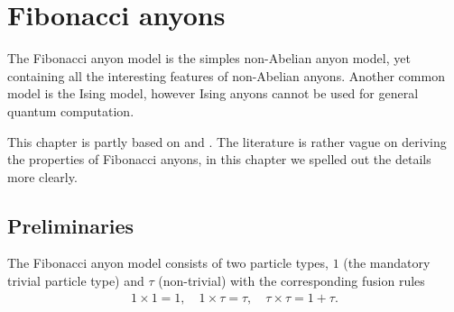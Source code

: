 \documentclass[a4paper,10pt,oneside]{book}
\theoremstyle{plain}
\theoremstyle{definition}
\theoremstyle{remark}
\begin{document}
{\chapter{Fibonacci anyons}\label{fibonacci anyons}

The Fibonacci anyon model is the simples non-Abelian anyon model, yet containing all the interesting features of non-Abelian anyons. Another common model is the Ising model, however Ising anyons cannot be used for general quantum computation.

This chapter is partly based on \cite{preskill} and \cite{topological quantum compiling}. The literature is rather vague on deriving the properties of Fibonacci anyons, in this chapter we spelled out the details more clearly.

\section{Preliminaries}

The Fibonacci anyon model consists of two particle types, $1$ (the mandatory trivial particle type) and $\tau$ (non-trivial) with the corresponding fusion rules
\begin{align*}
  1 \times 1 = 1, \quad
  1 \times \tau = \tau, \quad
  \tau \times \tau = 1 + \tau.
\end{align*}

}
\end{document}
